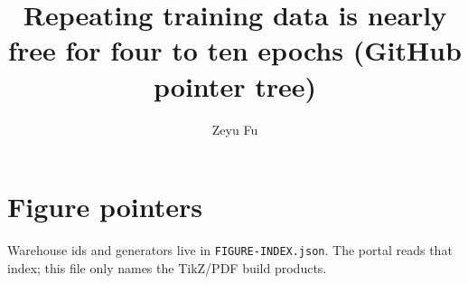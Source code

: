 \documentclass[11pt]{article}
\begin{document}
\title{Repeating training data is nearly free for four to ten epochs
  (GitHub pointer tree)}
\author{Zeyu Fu}
\maketitle

\section*{Figure pointers}
Warehouse ids and generators live in \texttt{FIGURE-INDEX.json}.
The portal reads that index; this file only names the TikZ/PDF build products.

\end{document}

